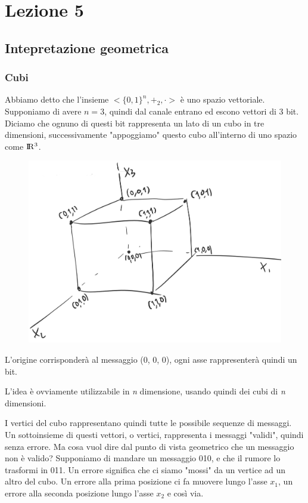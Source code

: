 \section*{Lezione 5}

\subsection*{Intepretazione geometrica}
\subsubsection*{Cubi}

Abbiamo detto che l'insieme $<\{0, 1\}^n, +_2, \cdot>$ è uno spazio vettoriale.
Supponiamo di avere $n=3$, quindi dal canale entrano ed escono vettori di 3 bit.
Diciamo che ognuno di questi bit rappresenta un lato di un cubo in tre dimensioni, successivamente "appoggiamo" questo cubo all'interno di uno spazio come ${\rm I\!R^3}$.

\begin{figure}[h]
	\centering
	\includegraphics[width=0.7\linewidth]{immagini/img7}
\end{figure}

L'origine corrisponderà al messaggio (0, 0, 0), ogni asse rappresenterà quindi un bit.

L'idea è ovviamente utilizzabile in \textit{n} dimensione, usando quindi dei cubi di \textit{n} dimensioni.

I vertici del cubo rappresentano quindi tutte le possibile sequenze di messaggi. Un sottoinsieme di questi vettori, o vertici, rappresenta i messaggi "validi", quindi senza errore.
Ma cosa vuol dire dal punto di vista geometrico che un messaggio non è valido?
Supponiamo di mandare un messaggio 010, e che il rumore lo trasformi in 011. Un errore significa che ci siamo "mossi" da un vertice ad un altro del cubo. Un errore alla prima posizione ci fa muovere lungo l'asse $x_1$, un errore alla seconda posizione lungo l'asse $x_2$ e così via.

